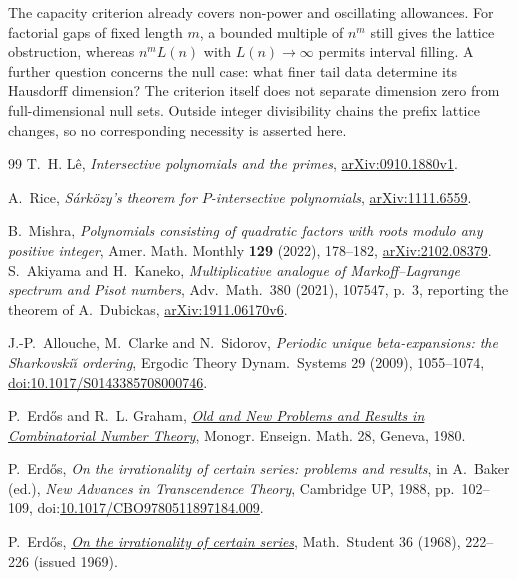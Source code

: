 \documentclass[11pt]{article}
\begin{document}
The capacity criterion already covers non-power and oscillating allowances.
For factorial gaps of fixed length $m$, a bounded multiple of $n^m$ still
gives the lattice obstruction, whereas $n^mL(n)$ with $L(n)\to\infty$
permits interval filling. A further question concerns the null case:
what finer tail data determine its Hausdorff dimension? The criterion itself
does not separate dimension zero from full-dimensional null sets. Outside
integer divisibility chains the prefix lattice changes, so no corresponding
necessity is asserted here.
\begin{thebibliography}{99}
 T.~H. L\^e,
\emph{Intersective polynomials and the primes},
\href{https://arxiv.org/abs/0910.1880v1}{arXiv:0910.1880v1}.

 A.~Rice,
\emph{S\'ark\"ozy's theorem for $P$-intersective polynomials},
\href{https://arxiv.org/abs/1111.6559}{arXiv:1111.6559}.

 B.~Mishra,
\emph{Polynomials consisting of quadratic factors with roots modulo any
positive integer}, Amer. Math. Monthly \textbf{129} (2022), 178--182,
\href{https://arxiv.org/abs/2102.08379}{arXiv:2102.08379}.
 S.~Akiyama and H.~Kaneko, \emph{Multiplicative analogue
of Markoff--Lagrange spectrum and Pisot numbers}, Adv.\ Math.\ 380 (2021),
107547, p.~3, reporting the theorem of A.~Dubickas,
\href{https://arxiv.org/abs/1911.06170v6}{arXiv:1911.06170v6}.

 J.-P.~Allouche, M.~Clarke and N.~Sidorov,
\emph{Periodic unique beta-expansions: the Sharkovski\u{\i} ordering},
Ergodic Theory Dynam.\ Systems 29 (2009), 1055--1074,
\href{https://doi.org/10.1017/S0143385708000746}{doi:10.1017/S0143385708000746}.

 P.~Erd\H{o}s and R.~L. Graham,
  \href{https://mathweb.ucsd.edu/~ronspubs/80_11_number_theory.pdf}{\emph{Old
  and New Problems and Results in Combinatorial Number Theory}},
  Monogr. Enseign. Math. 28, Geneva, 1980.

 P.~Erd\H{o}s, \emph{On the irrationality of certain series:
  problems and results}, in A.~Baker (ed.), \emph{New Advances in Transcendence
  Theory}, Cambridge UP, 1988, pp.~102--109,
  doi:\href{https://doi.org/10.1017/CBO9780511897184.009}{10.1017/CBO9780511897184.009}.

 P.~Erd\H{o}s,
  \href{https://users.renyi.hu/~p_erdos/1969-09.pdf}{\emph{On the
  irrationality of certain series}}, Math.\ Student 36 (1968), 222--226
  (issued 1969).


\end{thebibliography}
\end{document}
